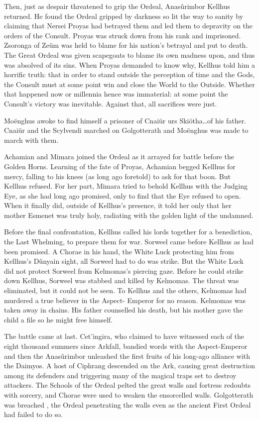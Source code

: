 \documentclass[]{book}
\begin{document}
Then, just as despair threatened to grip the Ordeal, Anasûrimbor Kellhus returned. He
found the Ordeal gripped by darkness so lit the way to sanity by claiming that Nersei
Proyas had betrayed them and led them to depravity on the orders of the Consult.
Proyas was struck down from his rank and imprisoned. Zsoronga of Zeüm was held to
blame for his nation's betrayal and put to death. The Great Ordeal was given scapegoats
to blame its own madness upon, and thus was absolved of its sins. When Proyas
demanded to know why, Kellhus told him a horrific truth: that in order to stand
outside the perception of time and the Gods, the Consult must at some point win and
close the World to the Outside. Whether that happened now or millennia hence was
immaterial: at some point the Consult's victory was inevitable. Against that, all
sacrifices were just.

Moënghus awoke to find himself a prisoner of Cnaiür urs Skiötha\ldots{}of his father.
Cnaiür and the Scylvendi marched on Golgotterath and Moënghus was made to march
with them.

Achamian and Mimara joined the Ordeal as it arrayed for battle before the Golden
Horns. Learning of the fate of Proyas, Achamian begged Kellhus for mercy, falling to
his knees (as long ago foretold) to ask for that boon. But Kellhus refused. For her part,
Mimara tried to behold Kellhus with the Judging Eye, as she had long ago promised,
only to find that the Eye refused to open. When it finally did, outside of Kellhus's
presence, it told her only that her mother Esmenet was truly holy, radiating with the
golden light of the undamned.

Before the final confrontation, Kellhus called his lords together for a benediction, the
Last Whelming, to prepare them for war. Sorweel came before Kellhus as had been
promised. A Chorae in his hand, the White Luck protecting him from Kellhus's
Dûnyain sight, all Sorweel had to do was strike. But the White Luck did not protect
Sorweel from Kelmomas's piercing gaze. Before he could strike down Kellhus, Sorweel
was stabbed and killed by Kelmomas. The threat was eliminated, but it could not be
seen. To Kellhus and the others, Kelmomas had murdered a true believer in the Aspect-
Emperor for no reason. Kelmomas was taken away in chains. His father counselled his
death, but his mother gave the child a file so he might free himself.

The battle came at last. Cet'ingira, who claimed to have witnessed each of the eight
thousand summers since Arkfall, bandied words with the Aspect-Emperor and then the
Anasûrimbor unleashed the first fruits of his long-ago alliance with the Daimyos. A
host of Ciphrang descended on the Ark, causing great destruction among its defenders
and triggering many of the magical traps set to destroy attackers. The Schools of the
Ordeal pelted the great walls and fortress redoubts with sorcery, and Chorae were used
to weaken the ensorcelled walls. Golgotterath was breached , the Ordeal penetrating the
walls even as the ancient First Ordeal had failed to do so.
\end{document}
